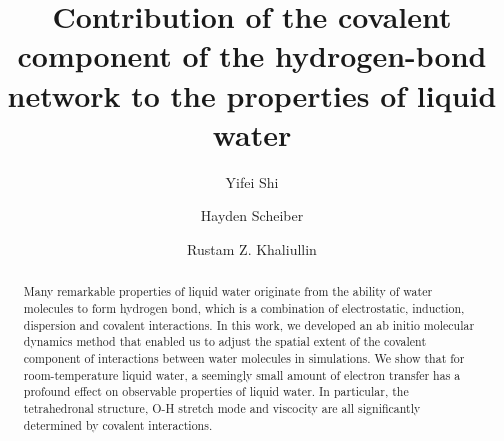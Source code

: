 \documentclass[aps,prl,reprint,amsmath,amssymb]{revtex4-1}
\begin{document}
\newcommand{\Ang}{\ensuremath{\mathring{\text{A}}}}
\newcommand{\ltwid}{\mathrel{\raise.3ex\hbox{$<$\kern-.75em\lower1ex\hbox{$\sim$}}}}
\newcommand{\gtwid}{\mathrel{\raise.3ex\hbox{$>$\kern-.75em\lower1ex\hbox{$\sim$}}}}
\newcommand{\bra}{\langle}
\newcommand{\ket}{\rangle}
\newcommand{\sill}{\psi}
\newcommand{\trace}{{\rm Tr}}
\newcommand{\ntilde}{\tilde{n}}
\newcommand{\stilde}{\tilde{s}}
\newcommand{\atilde}{\tilde{\alpha}}
\newcommand{\new}{\color{red}}
\newcommand{\old}{\color{black}}
\newcommand{\bea}{\begin{eqnarray}}
\newcommand{\eea}{\end{eqnarray}}
\def\nn{\nonumber\\}



\title{Contribution of the covalent component of the hydrogen-bond network to the properties of liquid water}

\author{Yifei Shi}

\author{Hayden Scheiber}

\author{Rustam Z. Khaliullin}


\begin{abstract}
Many remarkable properties of liquid water originate from the ability of water molecules to form hydrogen bond, which is a combination of electrostatic, induction, dispersion and covalent interactions. In this work, we developed an ab initio molecular dynamics method that enabled us to adjust the spatial extent of the covalent component of interactions between water molecules in simulations. We show that for room-temperature liquid water, a seemingly small amount of electron transfer has a profound effect on observable properties of liquid water. In particular, the tetrahedronal structure, O-H stretch mode and viscocity are all significantly determined by covalent interactions.


\end{abstract}
\maketitle
\end{document}
